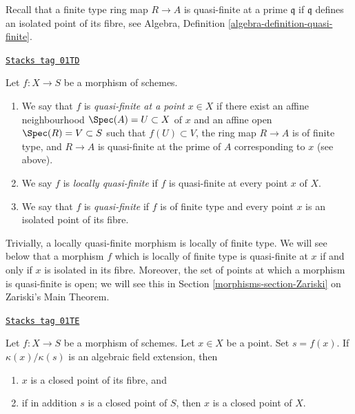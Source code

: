 \medskip\noindent
Recall that a finite type ring map $R \to A$ is quasi-finite at
a prime $\mathfrak q$ if $\mathfrak q$ defines an isolated point
of its fibre, see Algebra, Definition \ref{algebra-definition-quasi-finite}.

\begin{definition}
\label{morphisms-definition-quasi-finite}
\href{https://stacks.math.columbia.edu/tag/01TD}{\texttt{Stacks tag 01TD}}

\begin{reference}
\cite[II Definition 6.2.3]{EGA}
\end{reference}
Let $f : X \to S$ be a morphism of schemes.
\begin{enumerate}
\item We say that $f$ is {\it quasi-finite at a point $x \in X$}
if there exist an affine neighbourhood $\Spec(A) = U \subset X$
of $x$ and an affine open $\Spec(R) = V \subset S$ such that
$f(U) \subset V$, the ring map $R \to A$ is of finite type,
and $R \to A$ is quasi-finite at the prime of $A$ corresponding to $x$
(see above).
\item We say $f$ is {\it locally quasi-finite} if $f$ is
quasi-finite at every point $x$ of $X$.
\item We say that $f$ is {\it quasi-finite} if $f$ is of finite type
and every point $x$ is an isolated point of its fibre.
\end{enumerate}
\end{definition}

Trivially, a locally quasi-finite morphism is locally of finite type.
We will see below that a morphism $f$ which is locally of finite type
is quasi-finite at $x$ if and only if $x$ is isolated in its fibre.
Moreover, the set of points at which a morphism is quasi-finite is open;
we will see this in Section \ref{morphisms-section-Zariski} on Zariski's Main Theorem.

\begin{lemma}
\label{morphisms-lemma-algebraic-residue-field-extension-closed-point-fibre}
\href{https://stacks.math.columbia.edu/tag/01TE}{\texttt{Stacks tag 01TE}}

Let $f : X \to S$ be a morphism of schemes.
Let $x \in X$ be a point. Set $s = f(x)$.
If $\kappa(x)/\kappa(s)$
is an algebraic field extension, then
\begin{enumerate}
\item $x$ is a closed point of its fibre, and
\item if in addition $s$ is a closed point of $S$, then
$x$ is a closed point of $X$.
\end{enumerate}
\end{lemma}

